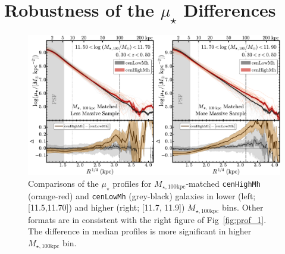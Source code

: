 \documentclass[a4paper,fleqn,usenatbib]{mnras}
\def\rbcg{\texttt{cenHighMh}}
\def\nbcg{\texttt{cenLowMh}}
\def\mtot{{$M_{\star,100\mathrm{kpc}}$}}
\def\mden{{$\mu_{\star}$}}
\begin{document}
    
\section{Robustness of the \mden{} Differences} 
	\label{app:robust}

  \begin{figure}
      \centering 
      \includegraphics[width=15.5cm]{fig/redbcg_prof_2}
      \caption{
          Comparisons of the \mden{} profiles for \mtot{}-matched \rbcg{} 
          (orange-red) and \nbcg{} (grey-black) galaxies in lower (left; [11.5,11.70]) 
          and higher (right; [11.7, 11.9]) \mtot{} bins. 
          Other formats are in consistent with the right figure of Fig~\ref{fig:prof_1}.
          The difference in median profiles is more significant in higher \mtot{} bin.
          }
      \label{fig:prof_2}
  \end{figure}
\end{document}
